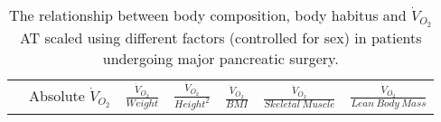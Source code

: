 \begin{sidewaystable}[p]
	\caption{The relationship between body composition, body habitus and $\dot{V}_{O_2}$AT scaled using different factors (controlled for sex) in patients undergoing major pancreatic surgery.}
	\label{table:bc_at_new_indices}
	\footnotesize
	\centering
	\renewcommand{\arraystretch}{1.5} %
	\begin{tabular}{|l|cc|cc|cc|cc|cc|cc|}
		\hline
		& \multicolumn{2}{c|}{Absolute $\dot{V}_{O_2}$} & \multicolumn{2}{c|}{$\frac{\dot{V}_{O_2}}{Weight}$} & \multicolumn{2}{c|}{$\frac{\dot{V}_{O_2}}{Height^2}$} & \multicolumn{2}{c|}{$\frac{\dot{V}_{O_2}}{BMI}$} & \multicolumn{2}{c|}{$\frac{\dot{V}_{O_2}}{Skeletal\ Muscle}$}  & \multicolumn{2}{c|}{$\frac{\dot{V}_{O_2}}{Lean\ Body\ Mass}$}\\
		

\end{tabular}
\end{sidewaystable}
